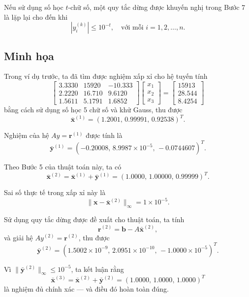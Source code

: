 Nếu sử dụng số học $t$-chữ số, một quy tắc dừng được khuyến nghị trong Bước 7 là lặp lại cho đến khi
\[
|y_i^{(k)}| \leq 10^{-t}, \quad \text{với mỗi } i = 1, 2, \dots, n.
\]

\subsection*{Minh họa}

Trong ví dụ trước, ta đã tìm được nghiệm xấp xỉ cho hệ tuyến tính
\[
\begin{bmatrix}
3.3330 & 15920 & -10.333 \\[3pt]
2.2220 & 16.710 & 9.6120 \\[3pt]
1.5611 & 5.1791 & 1.6852
\end{bmatrix}
\begin{bmatrix}
x_1 \\[3pt]
x_2 \\[3pt]
x_3
\end{bmatrix}
=
\begin{bmatrix}
15913 \\[3pt]
28.544 \\[3pt]
8.4254
\end{bmatrix}
\]
bằng cách sử dụng số học 5 chữ số và khử Gauss, thu được
\[
\bar{\mathbf{x}}^{(1)} = (1.2001,\, 0.99991,\, 0.92538)^{T}.
\]

Nghiệm của hệ $A y = \mathbf{r}^{(1)}$ được tính là
\[
\bar{\mathbf{y}}^{(1)} = (-0.20008,\, 8.9987 \times 10^{-5},\, -0.0744607)^{T}.
\]

Theo Bước 5 của thuật toán này, ta có
\[
\bar{\mathbf{x}}^{(2)} = \bar{\mathbf{x}}^{(1)} + \bar{\mathbf{y}}^{(1)} = (1.0000,\, 1.00000,\, 0.99999)^{T}.
\]

Sai số thực tế trong xấp xỉ này là
\[
\|\mathbf{x} - \bar{\mathbf{x}}^{(2)}\|_{\infty} = 1 \times 10^{-5}.
\]

Sử dụng quy tắc dừng được đề xuất cho thuật toán, ta tính
\[
\mathbf{r}^{(2)} = \mathbf{b} - A \bar{\mathbf{x}}^{(2)},
\]
và giải hệ $A y^{(2)} = \mathbf{r}^{(2)}$, thu được
\[
\bar{\mathbf{y}}^{(2)} = (1.5002 \times 10^{-9},\, 2.0951 \times 10^{-10},\, -1.0000 \times 10^{-5})^{T}.
\]

Vì $\|\bar{\mathbf{y}}^{(2)}\|_{\infty} \leq 10^{-5}$, ta kết luận rằng
\[
\bar{\mathbf{x}}^{(3)} = \bar{\mathbf{x}}^{(2)} + \bar{\mathbf{y}}^{(2)} = (1.0000,\, 1.0000,\, 1.0000)^{T}
\]
là nghiệm đủ chính xác — và điều đó hoàn toàn đúng.

\vspace{0.5em}

